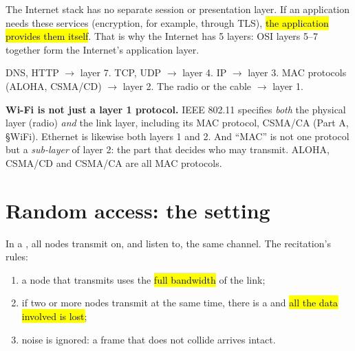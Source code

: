 \begin{intuition}
The Internet stack has no separate session or presentation layer. If an application needs these services (encryption, for example, through TLS), \hl{the application provides them itself}.
That is why the Internet has 5 layers: OSI layers 5--7 together form the Internet's application layer.
\end{intuition}

\begin{example}
DNS, HTTP $\to$ layer 7. TCP, UDP $\to$ layer 4. IP $\to$ layer 3. MAC protocols (ALOHA, CSMA/CD) $\to$ layer 2. The radio or the cable $\to$ layer 1.
\end{example}

\begin{pitfall}
\textbf{Wi-Fi is not just a layer 1 protocol.} IEEE 802.11 specifies \emph{both} the physical layer (radio) \emph{and} the link layer, including its MAC protocol, CSMA/CA (Part A, \S WiFi).
Ethernet is likewise both layers 1 and 2. And ``MAC'' is not one protocol but a \emph{sub-layer} of layer 2: the part that decides who may transmit. ALOHA, CSMA/CD and CSMA/CA are all MAC protocols.
\end{pitfall}

\section{Random access: the setting}

\begin{defn}
In a , all nodes transmit on, and listen to, the same channel. The recitation's rules:
\begin{enumerate}
  \item a node that transmits uses the \hl{full bandwidth} of the link;
  \item if two or more nodes transmit at the same time, there is a  and \hl{all the data involved is lost};
  \item noise is ignored: a frame that does not collide arrives intact.
\end{enumerate}
\end{defn}

